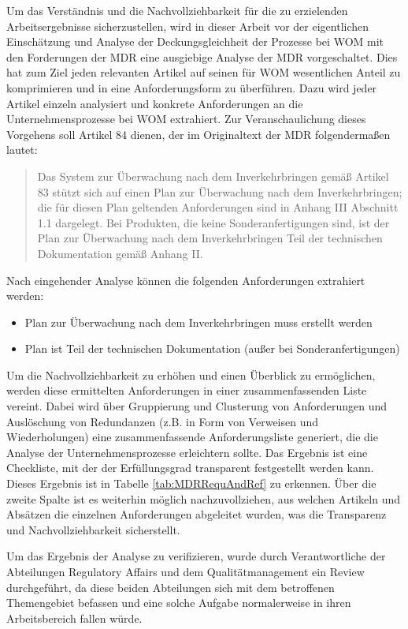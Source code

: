 \documentclass[a4paper,12pt]{report}
\begin{document}
Um das Verständnis und die Nachvollziehbarkeit für die zu erzielenden Arbeitsergebnisse sicherzustellen, wird in dieser Arbeit vor der eigentlichen Einschätzung und Analyse der Deckungsgleichheit der Prozesse bei WOM mit den Forderungen der MDR eine ausgiebige Analyse der MDR vorgeschaltet. Dies hat zum Ziel jeden relevanten Artikel auf seinen für WOM wesentlichen Anteil zu komprimieren und in eine Anforderungsform zu überführen. Dazu wird jeder Artikel einzeln analysiert und konkrete Anforderungen an die Unternehmensprozesse bei WOM extrahiert. Zur Veranschaulichung dieses Vorgehens soll Artikel 84 dienen, der im Originaltext der MDR folgendermaßen lautet:
\begin{quote}
Das System zur Überwachung nach dem Inverkehrbringen gemäß Artikel 83 stützt sich auf einen Plan zur Überwachung nach dem Inverkehrbringen; die für diesen Plan geltenden Anforderungen sind in Anhang III Abschnitt 1.1 dargelegt. Bei Produkten, die keine Sonderanfertigungen sind, ist der Plan zur Überwachung nach dem Inverkehrbringen Teil der technischen Dokumentation gemäß Anhang II.
\end{quote}
Nach eingehender Analyse können die folgenden Anforderungen extrahiert werden:
\begin{itemize}
\item Plan zur Überwachung nach dem Inverkehrbringen muss erstellt werden
\item Plan ist Teil der technischen Dokumentation (außer bei Sonderanfertigungen)
\end{itemize}
Um die Nachvollziehbarkeit zu erhöhen und einen Überblick zu ermöglichen, werden diese ermittelten Anforderungen in einer zusammenfassenden Liste vereint. Dabei wird über Gruppierung und Clusterung von Anforderungen und Auslöschung von Redundanzen (z.B. in Form von Verweisen und Wiederholungen) eine zusammenfassende Anforderungsliste generiert, die die Analyse der Unternehmensprozesse erleichtern sollte. Das Ergebnis ist eine Checkliste, mit der der Erfüllungsgrad transparent festgestellt werden kann. Dieses Ergebnis ist in Tabelle \ref{tab:MDRRequAndRef} zu erkennen. Über die zweite Spalte ist es weiterhin möglich nachzuvollziehen, aus welchen Artikeln und Absätzen die einzelnen Anforderungen abgeleitet wurden, was die Transparenz und Nachvollziehbarkeit sicherstellt.

Um das Ergebnis der Analyse zu verifizieren, wurde durch Verantwortliche der Abteilungen Regulatory Affairs und dem Qualitätmanagement ein Review durchgeführt, da diese beiden Abteilungen sich mit dem betroffenen Themengebiet befassen und eine solche Aufgabe normalerweise in ihren Arbeitsbereich fallen würde.
\end{document}
